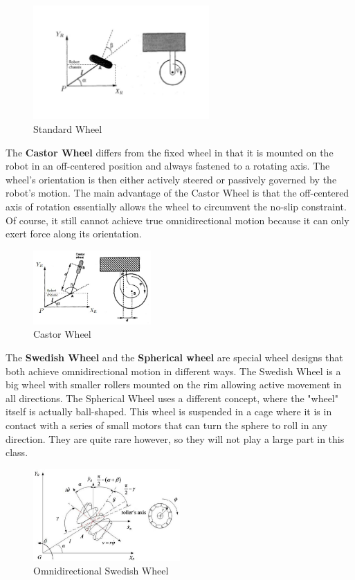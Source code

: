 \documentclass[twoside]{article}
\begin{document}
\begin{figure}[H]
\centering
\includegraphics[width=0.6\textwidth]{Standard_Wheel}
\caption{Standard Wheel}
\end{figure}


The \textbf{Castor Wheel} differs from the fixed wheel in that it is mounted on the robot in an off-centered position and always fastened to a rotating axis. The wheel's orientation is then either actively steered or passively governed by the robot's motion. The main advantage of the Castor Wheel is that the off-centered axis of rotation essentially allows the wheel to circumvent the no-slip constraint. Of course, it still cannot achieve true omnidirectional motion because it can only exert force along its orientation\cite{sns}.

\begin{figure}[H]
\centering
\includegraphics[width=0.4\textwidth]{cast}
\caption{Castor Wheel}
\end{figure}

The \textbf{Swedish Wheel} and the \textbf{Spherical wheel} are special wheel designs that both achieve omnidirectional motion in different ways. The Swedish Wheel is a big wheel with smaller rollers mounted on the rim allowing active movement in all directions\cite{sns}. The Spherical Wheel uses a different concept, where the "wheel" itself is actually ball-shaped. This wheel is suspended in a cage where it is in contact with a series of small motors that can turn the sphere to roll in any direction. They are quite rare however, so they will not play a large part in this class.

\begin{figure}[H]
\centering
\includegraphics[width=0.5\textwidth]{swedish}
\caption{Omnidirectional Swedish Wheel \cite{swed}}
\end{figure}
\end{document}
